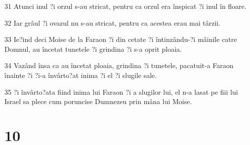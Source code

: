 \par 31 Atunci inul ?i orzul s-au stricat, pentru ca orzul era înspicat ?i inul în floare.
\par 32 Iar grâul ?i ovazul nu s-au stricat, pentru ca acestea erau mai târzii.
\par 33 Ie?ind deci Moise de la Faraon ?i din cetate ?i întinzându-?i mâinile catre Domnul, au încetat tunetele ?i grindina ?i s-a oprit ploaia.
\par 34 Vazând însa ca au încetat ploaia, grindina ?i tunetele, pacatuit-a Faraon înainte ?i ?i-a învârto?at inima ?i el ?i slugile sale.
\par 35 ?i învârto?ata fiind inima lui Faraon ?i a slugilor lui, el n-a lasat pe fiii lui Israel sa plece cum poruncise Dumnezeu prin mâna lui Moise.

\chapter{10}

